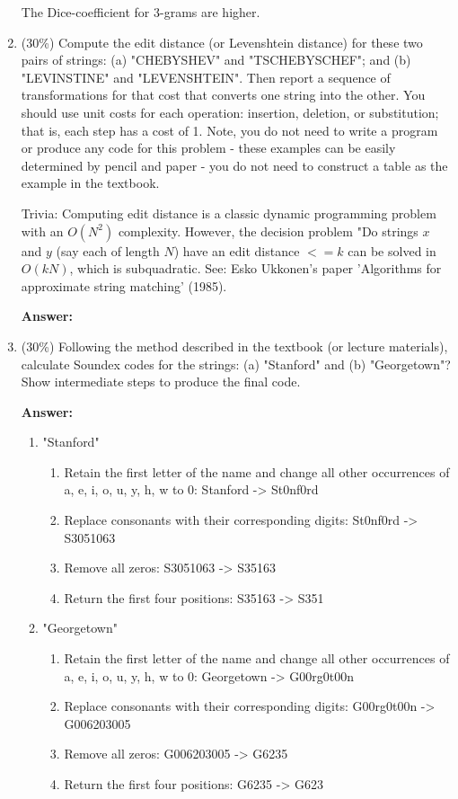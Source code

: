 \documentclass[11pt]{article}
\begin{document}
\begin{enumerate}
        The Dice-coefficient for 3-grams are higher.

        \item (30\%) Compute the edit distance (or Levenshtein distance) for these two pairs of strings: (a) "CHEBYSHEV" and "TSCHEBYSCHEF"; and (b) "LEVINSTINE" and "LEVENSHTEIN". Then report a sequence of transformations for that cost that converts one string into the other. You should use unit costs for each operation: insertion, deletion, or substitution; that is, each step has a cost of 1. Note, you do not need to write a program or produce any code for this problem - these examples can be easily determined by pencil and paper - you do not need to construct a table as the example in the textbook.

        Trivia: Computing edit distance is a classic dynamic programming problem with an $O(N^2)$ complexity. However, the decision problem "Do strings $x$ and $y$ (say each of length $N$) have an edit distance $<= k$ can be solved in $O(kN)$, which is subquadratic. See: Esko Ukkonen's paper 'Algorithms for approximate string matching' (1985).

        \textbf{Answer:}

        \item (30\%) Following the method described in the textbook (or lecture materials), calculate Soundex codes for the strings: (a) "Stanford" and (b) "Georgetown"? Show intermediate steps to produce the final code.

        \textbf{Answer:}
        \begin{enumerate}
            \item "Stanford"
            \begin{enumerate}
                \item Retain the first letter of the name and change all other occurrences of a, e, i, o, u, y, h, w to 0: Stanford -> St0nf0rd
                \item Replace consonants with their corresponding digits: St0nf0rd -> S3051063
                \item Remove all zeros: S3051063 -> S35163
                \item Return the first four positions: S35163 -> S351
            \end{enumerate}

            \item "Georgetown"
            \begin{enumerate}
                \item Retain the first letter of the name and change all other occurrences of a, e, i, o, u, y, h, w to 0: Georgetown -> G00rg0t00n
                \item Replace consonants with their corresponding digits: G00rg0t00n -> G006203005
                \item Remove all zeros: G006203005 -> G6235
                \item Return the first four positions: G6235 -> G623
            \end{enumerate}
        \end{enumerate}

    \end{enumerate}
\end{document}
